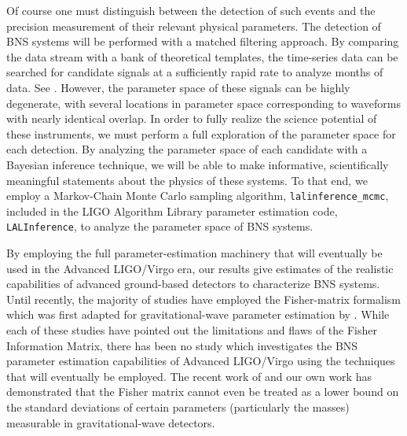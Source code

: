 \documentclass[11pt,a4paper]{emulateapj} 
\begin{document}
Of course one must distinguish between the detection of such events
and the precision measurement of their relevant physical parameters.
The detection of BNS systems will be performed with a matched
filtering approach.  By comparing the data stream with a bank of
theoretical templates, the time-series data can be searched for
candidate signals at a sufficiently rapid rate to analyze months of
data.  See \cite{S6search}.  However, the parameter space
of these signals can be highly degenerate, with several locations in
parameter space corresponding to waveforms with nearly identical overlap.  In order
to fully realize the science potential of these instruments, we must
perform a full exploration of the parameter space for each detection.
By analyzing the parameter space of each candidate with a Bayesian
inference technique, we will be able to make informative, scientifically
meaningful statements about the physics of these systems.  To that
end, we employ a Markov-Chain Monte Carlo sampling algorithm,
\texttt{lalinference\_mcmc}, included in the LIGO Algorithm Library
parameter estimation code, \texttt{LALInference}, to analyze the
parameter space of BNS systems.

By employing the full parameter-estimation machinery that will
eventually be used in the Advanced LIGO/Virgo era, our results
 give estimates of the realistic capabilities of
advanced ground-based detectors to characterize BNS systems.  Until
recently, the majority of studies have employed the Fisher-matrix
formalism which was first adapted for gravitational-wave parameter
estimation by \citet{FinnDetection}.  While each of these studies
\citep{PoissonWill,CutlerFlanagan,ArunPE} have pointed out the
limitations and flaws of the Fisher Information Matrix, there has been
no study which investigates the BNS parameter estimation capabilities
of Advanced LIGO/Virgo using the techniques that will eventually be
employed.  The recent work of \cite{Vallisneri} and our own work
\citep{Inadequacies} has demonstrated that the Fisher matrix cannot
even be treated as a lower bound on the standard deviations of certain
parameters (particularly the masses) measurable in gravitational-wave
detectors.
\end{document}
